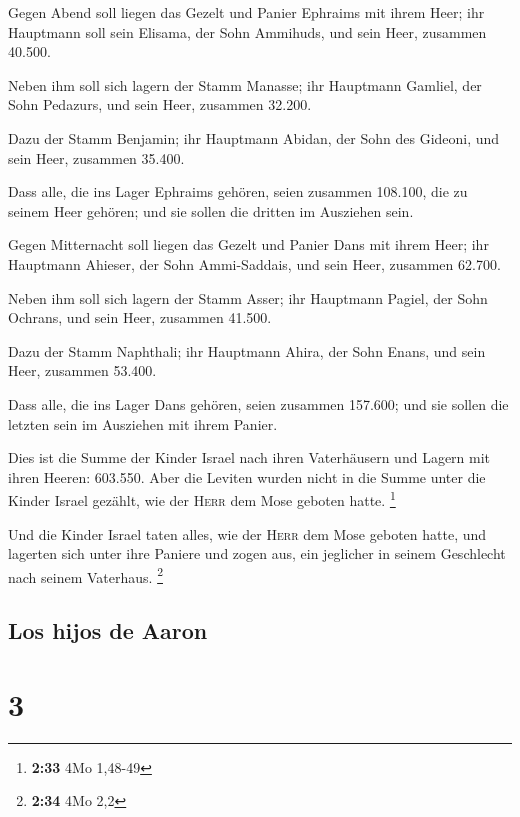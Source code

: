  Gegen Abend soll liegen das Gezelt und Panier Ephraims
mit ihrem Heer; ihr Hauptmann soll sein Elisama, der Sohn Ammihuds,
 und sein Heer, zusammen 40.500.

 Neben ihm soll sich lagern der Stamm Manasse; ihr
Hauptmann Gamliel, der Sohn Pedazurs,  und sein Heer,
zusammen 32.200.

 Dazu der Stamm Benjamin; ihr Hauptmann Abidan, der Sohn
des Gideoni,  und sein Heer, zusammen 35.400.

 Dass alle, die ins Lager Ephraims gehören, seien
zusammen 108.100, die zu seinem Heer gehören; und sie sollen die dritten
im Ausziehen sein.

 Gegen Mitternacht soll liegen das Gezelt und Panier Dans
mit ihrem Heer; ihr Hauptmann Ahieser, der Sohn Ammi-Saddais,
 und sein Heer, zusammen 62.700.

 Neben ihm soll sich lagern der Stamm Asser; ihr
Hauptmann Pagiel, der Sohn Ochrans,  und sein Heer,
zusammen 41.500.

 Dazu der Stamm Naphthali; ihr Hauptmann Ahira, der Sohn
Enans,  und sein Heer, zusammen 53.400.

 Dass alle, die ins Lager Dans gehören, seien zusammen
157.600; und sie sollen die letzten sein im Ausziehen mit ihrem Panier.

 Dies ist die Summe der Kinder Israel nach ihren
Vaterhäusern und Lagern mit ihren Heeren: 603.550.  Aber
die Leviten wurden nicht in die Summe unter die Kinder Israel gezählt,
wie der \textsc{Herr} dem Mose geboten hatte. \footnote{\textbf{2:33}
  4Mo 1,48-49}

 Und die Kinder Israel taten alles, wie der \textsc{Herr}
dem Mose geboten hatte, und lagerten sich unter ihre Paniere und zogen
aus, ein jeglicher in seinem Geschlecht nach seinem Vaterhaus.
\footnote{\textbf{2:34} 4Mo 2,2}

\hypertarget{los-hijos-de-aaron}{%
\subsection{Los hijos de Aaron}\label{los-hijos-de-aaron}}

\hypertarget{section-2}{%
\section{3}\label{section-2}}

